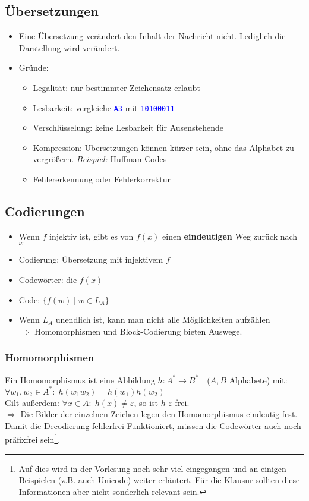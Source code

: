 \documentclass{article}
\newcommand{\blue}[1]{\textcolor{blue}{#1}}
\newcommand{\important}[1]{\textcolor{importantColor}{#1}}
\newcommand{\example}[1]{\textit{Beispiel: }#1}
\newcommand{\word}[1]{\blue{\texttt{#1}}}
\newcommand{\set}[1]{\{#1\}}
\begin{document}
\subsection{Übersetzungen}
\begin{itemize}
    \item Eine Übersetzung verändert den Inhalt der Nachricht nicht. Lediglich die Darstellung wird verändert.
    \item Gründe:
    \begin{itemize}
        \item \important{Legalität}: nur bestimmter Zeichensatz erlaubt
        \item \important{Lesbarkeit}: vergleiche \word{A3} mit \word{10100011}
        \item \important{Verschlüsselung}: keine Lesbarkeit für Ausenstehende
        \item \important{Kompression}: Übersetzungen können kürzer sein, ohne das Alphabet zu vergrößern. \example{Huffman-Codes}
        \item \important{Fehlererkennung} oder \important{Fehlerkorrektur}
    \end{itemize}
\end{itemize}

\subsection{Codierungen}
\begin{itemize}
    \item Wenn $f$ injektiv ist, gibt es von $f(x)$ einen \textbf{eindeutigen} Weg zurück nach $x$
    \item \important{Codierung}: Übersetzung mit injektivem $f$
    \item \important{Codewörter}: die $f(x)$
    \item \important{Code}: $\set{f(w)\mid w\in L_A}$
    \item Wenn $L_A$ unendlich ist, kann man nicht alle Möglichkeiten aufzählen\\
    $\Rightarrow$ Homomorphismen und Block-Codierung bieten Auswege.
\end{itemize}

\subsubsection{Homomorphismen}
Ein \important{Homomorphismus} ist eine Abbildung $h:A^*\to B^*\quad$($A,B$ Alphabete) mit:\\
$\forall w_1,w_2\in A^*:\;h(w_1w_2)=h(w_1)h(w_2)$\\
Gilt außerdem: $\forall x\in A:\;h(x)\not=\varepsilon$, so ist $h$ $\varepsilon$-frei.\\
$\Rightarrow$ Die Bilder der einzelnen Zeichen legen den Homomorphismus eindeutig fest.\\
Damit die Decodierung fehlerfrei Funktioniert, müssen die Codewörter auch noch \important{präfixfrei} sein\footnote{Auf dies wird in der Vorlesung noch sehr viel eingegangen und an einigen Beispielen (z.B. auch Unicode) weiter erläutert. Für die Klausur sollten diese Informationen aber nicht sonderlich relevant sein.}.
\end{document}
